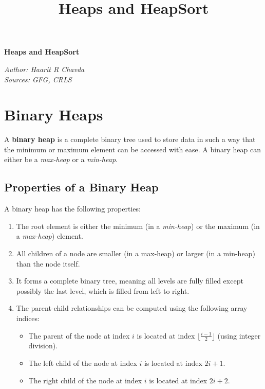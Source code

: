 \documentclass[a4paper,10pt]{article}
\begin{document}
\title{Heaps and HeapSort}

\begin{center}
    {\LARGE \bfseries Heaps and HeapSort} %
\end{center}

\begin{flushleft}
\textit{Author: Haarit R Chavda} \\
\textit{Sources: GFG, CRLS}
\end{flushleft}


\section{Binary Heaps}
A \textbf{binary heap} is a complete binary tree used to store data in such a way that the minimum or maximum element can be accessed with ease. A binary heap can either be a \textit{max-heap} or a \textit{min-heap}.

\subsection{Properties of a Binary Heap}
A binary heap has the following properties:
\begin{enumerate}
    \item The root element is either the minimum (in a \textit{min-heap}) or the maximum (in a \textit{max-heap}) element.
    \item All children of a node are smaller (in a max-heap) or larger (in a min-heap) than the node itself.
    \item It forms a complete binary tree, meaning all levels are fully filled except possibly the last level, which is filled from left to right.
    \item The parent-child relationships can be computed using the following array indices:
    \begin{itemize}
        \item The parent of the node at index $i$ is located at index $\lfloor \frac{i - 1}{2} \rfloor$ (using integer division).
        \item The left child of the node at index $i$ is located at index $2i + 1$.
        \item The right child of the node at index $i$ is located at index $2i + 2$.
    \end{itemize}
\end{enumerate}
\end{document}
